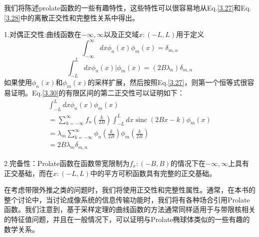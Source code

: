\documentclass[10pt, UTF8]{ctexart}%
\newcommand{\InsertEqution}[2]{\begin{equation}
  \label{#1}
   #2
 \end{equation}}
\newcommand{\RefEq}[1]{Eq.\ref{#1}}
\newcommand{\InsertInlineEq}[1]{$#1$}
\begin{document}
\begin{sloppypar}
我们将陈述prolate函数的一些有趣特性，这些特性可以很容易地从\RefEq{3.27}和\RefEq{3.28}中的离散正交性和完整性关系中得出。

1.对偶正交性:曲线函数在\InsertInlineEq{-\infty,\infty}以及正交域\InsertInlineEq{x:(-L,L)}用于定义\InsertEqution{3.29}{\int_{-\infty}^{\infty} d x \phi_{n}(x) \phi_{m}(x)=\delta_{m, n}}
\InsertEqution{3.30}{\int_{-L}^{L}d x \phi_{n}(x) | \phi_{m}(x)=\left(2 B \lambda_{n}\right) \delta_{m, n}}
如果使用\InsertInlineEq{\phi_n(x)}和\InsertInlineEq{\phi_m(x)}的采样扩展，然后按照\RefEq{3.27}，则第一个恒等式很容易证明。\RefEq{3.30}的有限区间的第二正交性可以证明如下：\InsertEqution{3.31}{\begin{array}{l}
  \int_{-L}^{L} d x \phi_{n}(x) \phi_{m}(x) \\
  =\sum\limits_{k=-\infty}^{\infty} f_{n}\left(\frac{k}{2 B}\right) \int_{-L}^{L} d x \operatorname{sinc}(2 B x-k) \phi_{m}(x) \\
  =\lambda_{m} \sum\limits_{k=-\infty}^{\infty} \phi_{n}\left(\frac{k}{2 B}\right) \phi_{m}\left(\frac{k}{2 B}\right) \\
  =2 B \lambda_{m} \delta_{m, n}
  \end{array}}

  2.完备性：Prolate函数在函数带宽限制为\InsertInlineEq{f_x:(-B,B)}的情况下在\InsertInlineEq{-\infty,\infty}上具有正交基础，而在\InsertInlineEq{x:(-L,L)}中的平方可积函数具有完整的正交基础。

  在考虑带限外推之类的问题时，我们将使用正交性和完整性属性。通常，在本书的整个讨论中，当讨论成像系统的信息传输功能时，我们将有各种场合引用Prolate函数。我们注意到，基于采样定理的曲线函数的方法通常同样适用于与带限核相关的特征值问题，并且在一般情况下，可以证明与Prolate椭球体类似的一些有趣的数学关系。

  \end{sloppypar}
\end{document}
